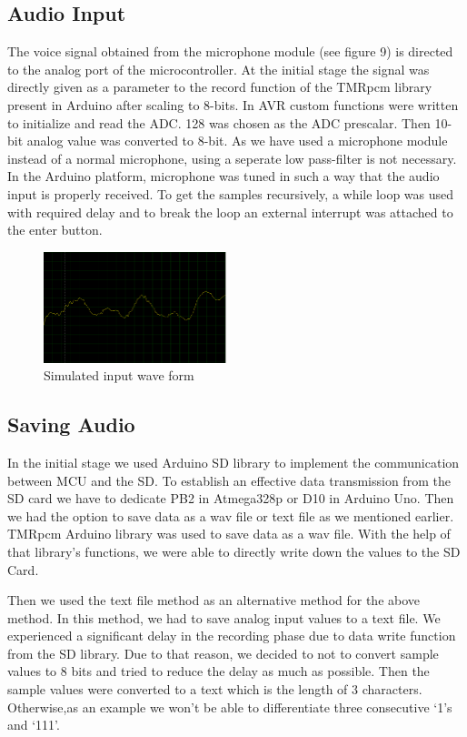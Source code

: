 \documentclass[11pt]{article}
\begin{document}
\subsection{Audio Input}
The voice signal obtained from the microphone module (see figure 9) is directed to the analog port of the microcontroller. At the initial stage the signal was directly given as a parameter to the record function of  the TMRpcm library present in Arduino  after scaling to 8-bits. In AVR custom functions were written to initialize and read the ADC. 128 was chosen as the ADC prescalar. Then 10-bit analog value was converted to 8-bit. As we have used a microphone module instead of a normal microphone, using a seperate low pass-filter is not necessary. In the Arduino platform, microphone was tuned in such a way that the audio input is properly received. To get the samples recursively, a while loop was used with required delay and to break the loop an external interrupt was attached to the enter button.
\begin{figure}
    \centering
    \includegraphics[width=0.475\textwidth]{Images/inputWave.PNG}
    \caption{Simulated input wave form}
\end{figure}

\subsection{Saving Audio}
In the initial stage we used Arduino SD library to implement the communication between MCU and the SD. To establish an effective data transmission from the SD card we have to dedicate PB2 in  Atmega328p or D10 in Arduino Uno. Then we had the option to save data as a wav file or text file as we mentioned earlier. TMRpcm Arduino library was used to save data as a wav file. With the help of that library’s functions, we were able to directly write down the values to the SD Card. 

Then we used the text file method as an alternative method for the above method. In this method, we had to save analog input values to a text file. 
We experienced a significant delay in the recording phase due to data write function from the SD library. Due to that reason, we decided to not to convert sample values to 8 bits and tried to reduce the delay as much as possible.  Then the sample values were converted to a text which is the length of 3 characters. Otherwise,as an example we won’t be able to differentiate three consecutive ‘1’s and ‘111’.
\end{document}
